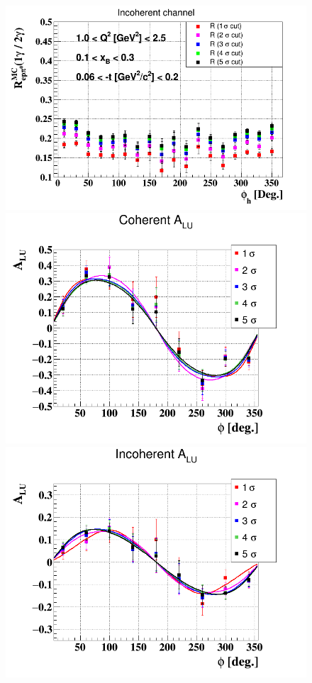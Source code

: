 \begin{figure}[h!]
\hspace{-0.2in}\includegraphics[scale=0.31]{fig_dvcs/R_epgamma_eppi0_Phi.png}
\includegraphics[scale=0.31]{fig_dvcs/BSA_Coherent_sigmas.png}
\includegraphics[scale=0.31]{fig_dvcs/BSA_InCoherent_sigmas.png}

\end{figure}
